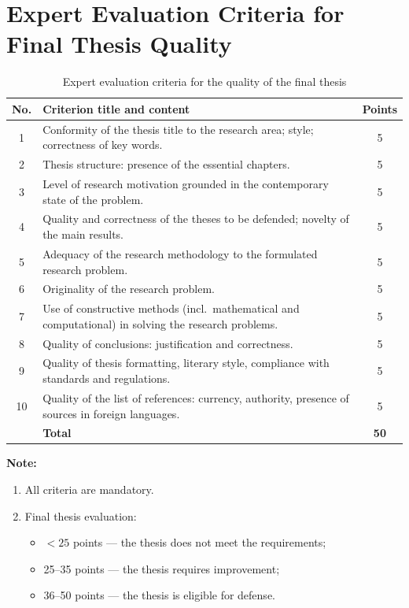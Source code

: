 \chapter{Expert Evaluation Criteria for Final Thesis Quality}
\label{app:evaluation}

\begin{table}[htbp]
\caption{Expert evaluation criteria for the quality of the final thesis}
\label{tab:eval-criteria}
\centering
\small
\begin{tabular}{clc}
\toprule
\textbf{No.} & \textbf{Criterion title and content} & \textbf{Points} \\
\midrule
1 & Conformity of the thesis title to the research area; style; correctness of key words. & 5 \\
2 & Thesis structure: presence of the essential chapters. & 5 \\
3 & Level of research motivation grounded in the contemporary state of the problem. & 5 \\
4 & Quality and correctness of the theses to be defended; novelty of the main results. & 5 \\
5 & Adequacy of the research methodology to the formulated research problem. & 5 \\
6 & Originality of the research problem. & 5 \\
7 & Use of constructive methods (incl.\ mathematical and computational) in solving the research problems. & 5 \\
8 & Quality of conclusions: justification and correctness. & 5 \\
9 & Quality of thesis formatting, literary style, compliance with standards and regulations. & 5 \\
10 & Quality of the list of references: currency, authority, presence of sources in foreign languages. & 5 \\
\midrule
 & \textbf{Total} & \textbf{50} \\
\bottomrule
\end{tabular}
\end{table}

\textbf{Note:}
\begin{enumerate}
  \item All criteria are mandatory.
  \item Final thesis evaluation:
  \begin{itemize}
    \item $<25$ points --- the thesis does not meet the requirements;
    \item 25--35 points --- the thesis requires improvement;
    \item 36--50 points --- the thesis is eligible for defense.
  \end{itemize}
\end{enumerate}